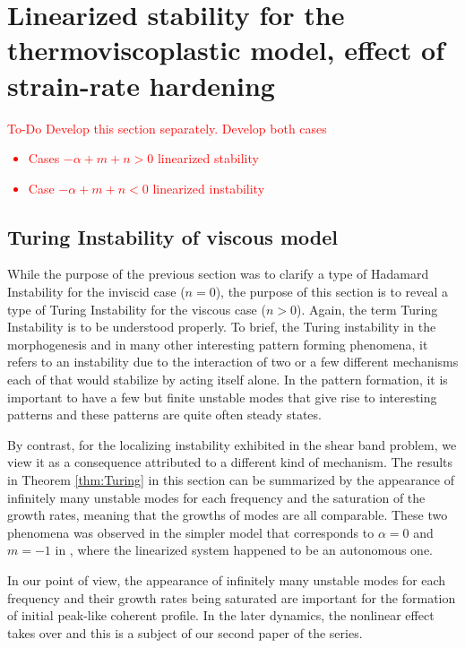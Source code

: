 \documentclass[a4paper,11pt]{article}
\newcommand{\tcr}{\textcolor{red}}
\theoremstyle{remark}
\begin{document}
\vfil\eject


\section{Linearized stability for the thermoviscoplastic model, effect of strain-rate hardening}

\tcr{ To-Do  Develop this section separately. Develop both cases
\begin{itemize}
\item Cases $-\alpha + m + n  > 0$ linearized stability
\item Case $-\alpha + m + n  <  0$ linearized instability
\end{itemize}
}

\subsection{Turing Instability of viscous model}
While the purpose of the previous section was to clarify a type of Hadamard Instability for the inviscid case ($n=0$), the purpose of this section is to reveal a type of Turing Instability for the viscous case ($n>0$). Again, the term Turing Instability is to be understood properly. To brief, the Turing instability in the {morphogenesis} and in many other interesting pattern forming phenomena, it refers to an instability due to the interaction of two or a few different  mechanisms each of that would stabilize by acting itself alone. In the pattern formation, it is important to have a few but finite unstable modes that give rise to interesting patterns and these patterns are quite often steady states.

By contrast, for the localizing instability exhibited in the shear band problem, we view it as a consequence attributed to a different kind of mechanism. The results in Theorem \ref{thm:Turing} in this section can be summarized by the appearance of infinitely many unstable modes for each frequency and the saturation of the growth rates, meaning that the growths of modes are all comparable. These two phenomena was observed in the simpler model that corresponds to $\alpha=0$ and $m=-1$ in \cite{KLT16}, where the linearized system happened to be an autonomous one.

In our point of view, the appearance of infinitely many unstable modes for each frequency and their growth rates being saturated are important for the formation of initial peak-like coherent profile. In the later dynamics, the nonlinear effect takes over and this is a subject of our second paper of the series.
\end{document}
